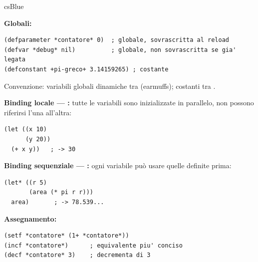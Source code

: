 \begin{refbox}{csBlue}
\label{sec:variabili}

\textbf{Globali:}\nopagebreak
\begin{lstlisting}
(defparameter *contatore* 0)  ; globale, sovrascritta al reload
(defvar *debug* nil)          ; globale, non sovrascritta se gia' legata
(defconstant +pi-greco+ 3.14159265) ; costante
\end{lstlisting}

Convenzione: variabili globali dinamiche tra  (earmuffs);
costanti tra .

\medskip
\textbf{Binding locale — :} tutte le variabili sono
inizializzate in parallelo, non possono riferirsi l'una all'altra:\nopagebreak
\begin{lstlisting}
(let ((x 10)
      (y 20))
  (+ x y))   ; -> 30
\end{lstlisting}

\textbf{Binding sequenziale — :} ogni variabile può
usare quelle definite prima:\nopagebreak
\begin{lstlisting}
(let* ((r 5)
       (area (* pi r r)))
  area)       ; -> 78.539...
\end{lstlisting}

\textbf{Assegnamento:}\nopagebreak
\begin{lstlisting}
(setf *contatore* (1+ *contatore*))
(incf *contatore*)      ; equivalente piu' conciso
(decf *contatore* 3)    ; decrementa di 3
\end{lstlisting}

\end{refbox}

